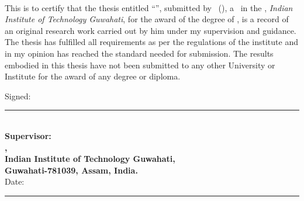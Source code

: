 \documentclass[11pt, a4paper, twoside]{Thesis} %
\begin{document}
\clearpage %

\pagestyle{empty} %

\begin{titlepage}
\begin{center}
\textsc{\textbf{\fontsize{31}{32}\selectfont{Certificate}}}\\[2.0cm] %
\end{center}

 \vspace{0.5cm}

This is to certify that the thesis entitled ``\textbf{\thesisTitle}'',
submitted by \authorName \ (\enrollmentNumber), a \studentType \ in the \textit{\departmentName},
\textit{Indian Institute of Technology Guwahati}, for the award of the degree of \degreeName, is a
record of an original research work carried out by him under my supervision
and guidance. The thesis has fulfilled all requirements as per the
regulations of the institute and in my opinion has reached the standard
needed for submission. The results embodied in this thesis have not
been submitted to any other University or Institute for the award
of any degree or diploma.

\vspace{3cm}
Signed:\\ \rule[1em]{25em}{0.5pt}\\[0.1cm] %
\textbf{Supervisor: \supervisorName}\\
\textbf{\departmentName,}\\
\textbf{Indian Institute of Technology Guwahati,}\\
\textbf{Guwahati-781039, Assam, India.}\\[2cm] \hfill{}Date:\\ \rule[1em]{25em}{0.5pt} %

\end{titlepage}


\begin{titlepage}
\begin{center}
\textsc{\textbf{\fontsize{31}{32}\selectfont{Acknowledgements}}}\\[1.0cm] %
\end{center}

  

\end{titlepage}
\end{document}
